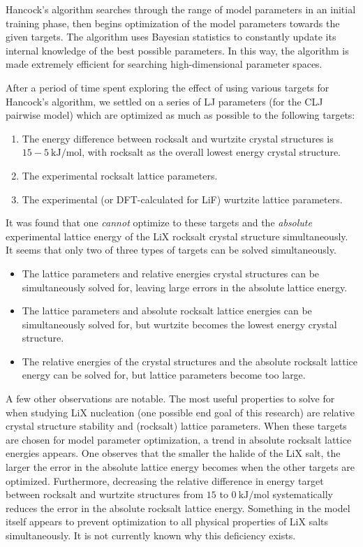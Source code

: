 \documentclass[aip,preprint,amsmath,amssymb,hidelinks]{revtex4-1}
\begin{document}
	Hancock's algorithm searches through the range of model parameters in an initial training phase, then begins optimization of the model parameters towards the given targets. The algorithm uses Bayesian statistics to constantly update its internal knowledge of the best possible parameters. In this way, the algorithm is made extremely efficient for searching high-dimensional parameter spaces.
	
	After a period of time spent exploring the effect of using various targets for Hancock's algorithm, we settled on a series of LJ parameters (for the CLJ pairwise model) which are optimized as much as possible to the following targets:
	\begin{enumerate}
		\item The energy difference between rocksalt and wurtzite crystal structures is $15 - \SI{5}{\kilo\joule\per\mole}$, with rocksalt as the overall lowest energy crystal structure.
		\item The experimental rocksalt lattice parameters.
		\item The experimental (or DFT-calculated for LiF) wurtzite lattice parameters.
	\end{enumerate}
	It was found that one \textit{cannot} optimize to these targets and the \textit{absolute} experimental lattice energy of the LiX rocksalt crystal structure simultaneously. It seems that only two of three types of targets can be solved simultaneously.
	\begin{itemize}
	\item The lattice parameters and relative energies crystal structures can be simultaneously solved for, leaving large errors in the absolute lattice energy.
	\item The lattice parameters and absolute rocksalt lattice energies can be simultaneously solved for, but wurtzite becomes the lowest energy crystal structure.
	\item The relative energies of the crystal structures and the absolute rocksalt lattice energy can be solved for, but lattice parameters become too large.
	\end{itemize}
	A few other observations are notable. The most useful properties to solve for when studying LiX nucleation (one possible end goal of this research) are relative crystal structure stability and (rocksalt) lattice parameters. When these targets are chosen for model parameter optimization, a trend in absolute rocksalt lattice energies appears. One observes that the smaller the halide of the LiX salt, the larger the error in the absolute lattice energy becomes when the other targets are optimized. Furthermore, decreasing the relative difference in energy target between rocksalt and wurtzite structures from $15$ to $\SI{0}{\kilo\joule\per\mole}$ systematically reduces the error in the absolute rocksalt lattice energy. Something in the model itself appears to prevent optimization to all physical properties of LiX salts simultaneously. It is not currently known why this deficiency exists.
	
\end{document}
